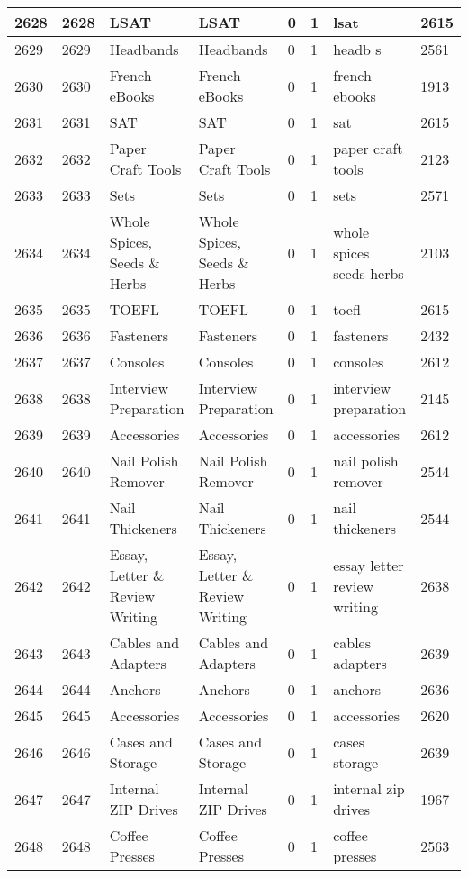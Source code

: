 \begin{longtable}{|l|l|l|l|l|l|l|l|}
2628 & 2628 & LSAT & LSAT & 0 & 1 & lsat & 2615 \\ \hline 
2629 & 2629 & Headbands & Headbands & 0 & 1 & headb s & 2561 \\ \hline 
2630 & 2630 & French eBooks & French eBooks & 0 & 1 & french ebooks & 1913 \\ \hline 
2631 & 2631 & SAT & SAT & 0 & 1 & sat & 2615 \\ \hline 
2632 & 2632 & Paper Craft Tools & Paper Craft Tools & 0 & 1 & paper craft tools & 2123 \\ \hline 
2633 & 2633 & Sets & Sets & 0 & 1 & sets & 2571 \\ \hline 
2634 & 2634 & Whole Spices, Seeds \& Herbs & Whole Spices, Seeds \& Herbs & 0 & 1 & whole spices seeds herbs & 2103 \\ \hline 
2635 & 2635 & TOEFL & TOEFL & 0 & 1 & toefl & 2615 \\ \hline 
2636 & 2636 & Fasteners & Fasteners & 0 & 1 & fasteners & 2432 \\ \hline 
2637 & 2637 & Consoles & Consoles & 0 & 1 & consoles & 2612 \\ \hline 
2638 & 2638 & Interview Preparation & Interview Preparation & 0 & 1 & interview preparation & 2145 \\ \hline 
2639 & 2639 & Accessories & Accessories & 0 & 1 & accessories & 2612 \\ \hline 
2640 & 2640 & Nail Polish Remover & Nail Polish Remover & 0 & 1 & nail polish remover & 2544 \\ \hline 
2641 & 2641 & Nail Thickeners & Nail Thickeners & 0 & 1 & nail thickeners & 2544 \\ \hline 
2642 & 2642 & Essay, Letter \& Review Writing & Essay, Letter \& Review Writing & 0 & 1 & essay letter review writing & 2638 \\ \hline 
2643 & 2643 & Cables and Adapters & Cables and Adapters & 0 & 1 & cables adapters & 2639 \\ \hline 
2644 & 2644 & Anchors & Anchors & 0 & 1 & anchors & 2636 \\ \hline 
2645 & 2645 & Accessories & Accessories & 0 & 1 & accessories & 2620 \\ \hline 
2646 & 2646 & Cases and Storage & Cases and Storage & 0 & 1 & cases storage & 2639 \\ \hline 
2647 & 2647 & Internal ZIP Drives & Internal ZIP Drives & 0 & 1 & internal zip drives & 1967 \\ \hline 
2648 & 2648 & Coffee Presses & Coffee Presses & 0 & 1 & coffee presses & 2563 \\ \hline 

\end{longtable}
